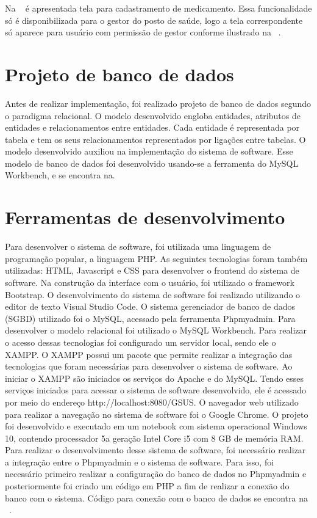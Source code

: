 %

Na ~ é apresentada tela para cadastramento de medicamento. Essa funcionalidade só é disponibilizada para o gestor do posto de saúde, logo a tela correspondente só aparece para usuário com permissão de gestor conforme ilustrado na ~. 

\section{Projeto de banco de dados}

Antes de realizar implementação, foi realizado projeto de banco de dados segundo o paradigma relacional. O modelo desenvolvido engloba entidades, atributos de entidades e relacionamentos entre entidades. Cada entidade é representada por tabela e tem os seus relacionamentos representados por ligações entre tabelas. O modelo desenvolvido auxiliou na implementação do sistema de software. Esse modelo de banco de dados foi desenvolvido usando-se a ferramenta do MySQL Workbench, e se encontra na.


%

\section{Ferramentas de desenvolvimento}
Para desenvolver o sistema de software, foi utilizada uma linguagem de programação popular, a linguagem PHP. As seguintes tecnologias foram também utilizadas: \acrfull{HTML}, Javascript e \acrfull{CSS} para desenvolver o frontend do sistema de software. Na construção da interface com o usuário, foi utilizado o framework Bootstrap. O desenvolvimento do sistema de software foi realizado utilizando o editor de texto Visual Studio Code. O sistema gerenciador de banco de dados (SGBD) utilizado foi o MySQL, acessado pela ferramenta Phpmyadmin. Para desenvolver o modelo relacional foi utilizado o MySQL Workbench. Para realizar o acesso dessas tecnologias foi configurado um servidor local, sendo ele o XAMPP. O XAMPP possui um pacote que permite realizar a integração das tecnologias que foram necessárias para desenvolver o sistema de software. Ao iniciar o XAMPP são iniciados os serviços do Apache e do MySQL. Tendo esses serviços iniciados para acessar o sistema de software desenvolvido, ele é acessado por meio do endereço http://localhost:8080/GSUS. O navegador web utilizado para realizar a navegação no sistema de software foi o Google Chrome. O projeto foi desenvolvido e executado em um notebook com sistema operacional Windows 10, contendo processador 5a geração Intel Core i5 com 8 GB de memória RAM. Para realizar o desenvolvimento desse sistema de software, foi necessário realizar a integração entre o Phpmyadmin e o sistema de software. Para isso, foi necessário primeiro realizar a configuração do banco de dados no Phpmyadmin e posteriormente foi criado um código em PHP a fim de realizar a conexão do banco com o sistema. Código para conexão com o banco de dados se encontra na ~.


%